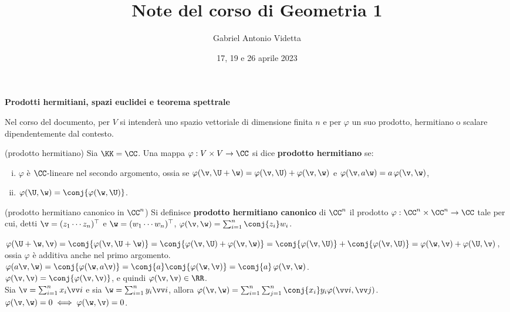 \documentclass[11pt]{article}
\title{\textbf{Note del corso di Geometria 1}}
\author{Gabriel Antonio Videtta}
\date{17, 19 e 26 aprile 2023}
\begin{document}
	
	\maketitle
	
	\begin{center}
		\Large \textbf{Prodotti hermitiani, spazi euclidei e teorema spettrale}
	\end{center}
	
	\begin{note}
		Nel corso del documento, per $V$ si intenderà uno spazio vettoriale di dimensione
		finita $n$ e per $\varphi$ un suo prodotto, hermitiano o scalare
		dipendentemente dal contesto.
	\end{note}

	\begin{definition} (prodotto hermitiano) Sia $\KK = \CC$. Una mappa $\varphi : V \times V \to \CC$ si dice \textbf{prodotto hermitiano} se:
		
		\begin{enumerate}[(i)]
			\item $\varphi$ è $\CC$-lineare nel secondo argomento, ossia se $\varphi(\v, \U + \w) = \varphi(\v, \U) + \varphi(\v, \w)$ e
			$\varphi(\v, a \w) = a \, \varphi(\v, \w)$,
			\item $\varphi(\U, \w) = \conj{\varphi(\w, \U)}$.
		\end{enumerate}
	\end{definition}

	\begin{definition} (prodotto hermitiano canonico in $\CC^n$) Si definisce
		\textbf{prodotto hermitiano canonico} di $\CC^n$ il prodotto $\varphi : \CC^n \times \CC^n \to \CC$ tale per cui, detti $\v = (z_1 \cdots z_n)^\top$ e $\w = (w_1 \cdots w_n)^\top$, $\varphi(\v, \w) = \sum_{i=1}^n \conj{z_i} w_i$.
	\end{definition}

	\begin{remark}\nl
		\li $\varphi(\U + \w, \v) = \conj{\varphi(\v, \U + \w)} =
		\conj{\varphi(\v, \U) + \varphi(\v, \w)} = \conj{\varphi(\v, \U)} + \conj{\varphi(\v, \U)} = \varphi(\w, \v) + \varphi(\U, \v)$, ossia
		$\varphi$ è additiva anche nel primo argomento. \\
		\li $\varphi(a \v, \w) = \conj{\varphi(\w, a \v)} = \conj{a} \conj{\varphi(\w, \v)} = \conj{a} \, \varphi(\v, \w)$. \\
		\li $\varphi(\v, \v) = \conj{\varphi(\v, \v)}$, e quindi $\varphi(\v, \v) \in \RR$. \\
		\li Sia $\v = \sum_{i=1}^n x_i \vv i$ e sia $\w = \sum_{i=1}^n y_i \vv i$, allora $\varphi(\v, \w) = \sum_{i =1}^n \sum_{j=1}^n \conj{x_i} y_i \varphi(\vv i, \vv j)$. \\
		\li $\varphi(\v, \w) = 0 \iff \varphi(\w, \v) = 0$.
	\end{remark}
\end{document}
